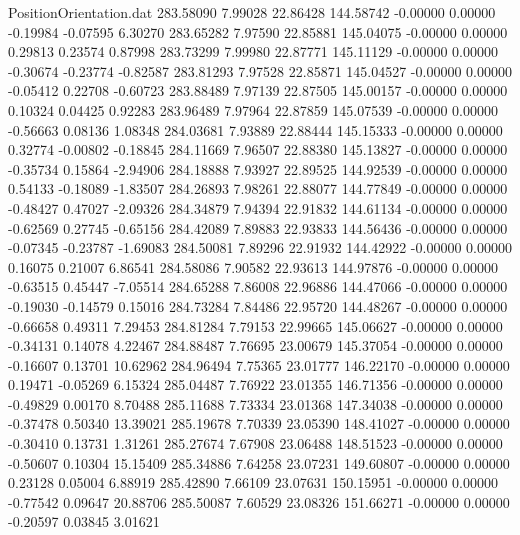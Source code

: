 \begin{filecontents}{PositionOrientation.dat}
 283.58090    7.99028   22.86428   144.58742   -0.00000    0.00000   -0.19984   -0.07595    6.30270
 283.65282    7.97590   22.85881   145.04075   -0.00000    0.00000    0.29813    0.23574    0.87998
 283.73299    7.99980   22.87771   145.11129   -0.00000    0.00000   -0.30674   -0.23774   -0.82587
 283.81293    7.97528   22.85871   145.04527   -0.00000    0.00000   -0.05412    0.22708   -0.60723
 283.88489    7.97139   22.87505   145.00157   -0.00000    0.00000    0.10324    0.04425    0.92283
 283.96489    7.97964   22.87859   145.07539   -0.00000    0.00000   -0.56663    0.08136    1.08348
 284.03681    7.93889   22.88444   145.15333   -0.00000    0.00000    0.32774   -0.00802   -0.18845
 284.11669    7.96507   22.88380   145.13827   -0.00000    0.00000   -0.35734    0.15864   -2.94906
 284.18888    7.93927   22.89525   144.92539   -0.00000    0.00000    0.54133   -0.18089   -1.83507
 284.26893    7.98261   22.88077   144.77849   -0.00000    0.00000   -0.48427    0.47027   -2.09326
 284.34879    7.94394   22.91832   144.61134   -0.00000    0.00000   -0.62569    0.27745   -0.65156
 284.42089    7.89883   22.93833   144.56436   -0.00000    0.00000   -0.07345   -0.23787   -1.69083
 284.50081    7.89296   22.91932   144.42922   -0.00000    0.00000    0.16075    0.21007    6.86541
 284.58086    7.90582   22.93613   144.97876   -0.00000    0.00000   -0.63515    0.45447   -7.05514
 284.65288    7.86008   22.96886   144.47066   -0.00000    0.00000   -0.19030   -0.14579    0.15016
 284.73284    7.84486   22.95720   144.48267   -0.00000    0.00000   -0.66658    0.49311    7.29453
 284.81284    7.79153   22.99665   145.06627   -0.00000    0.00000   -0.34131    0.14078    4.22467
 284.88487    7.76695   23.00679   145.37054   -0.00000    0.00000   -0.16607    0.13701   10.62962
 284.96494    7.75365   23.01777   146.22170   -0.00000    0.00000    0.19471   -0.05269    6.15324
 285.04487    7.76922   23.01355   146.71356   -0.00000    0.00000   -0.49829    0.00170    8.70488
 285.11688    7.73334   23.01368   147.34038   -0.00000    0.00000   -0.37478    0.50340   13.39021
 285.19678    7.70339   23.05390   148.41027   -0.00000    0.00000   -0.30410    0.13731    1.31261
 285.27674    7.67908   23.06488   148.51523   -0.00000    0.00000   -0.50607    0.10304   15.15409
 285.34886    7.64258   23.07231   149.60807   -0.00000    0.00000    0.23128    0.05004    6.88919
 285.42890    7.66109   23.07631   150.15951   -0.00000    0.00000   -0.77542    0.09647   20.88706
 285.50087    7.60529   23.08326   151.66271   -0.00000    0.00000   -0.20597    0.03845    3.01621

\end{filecontents}
